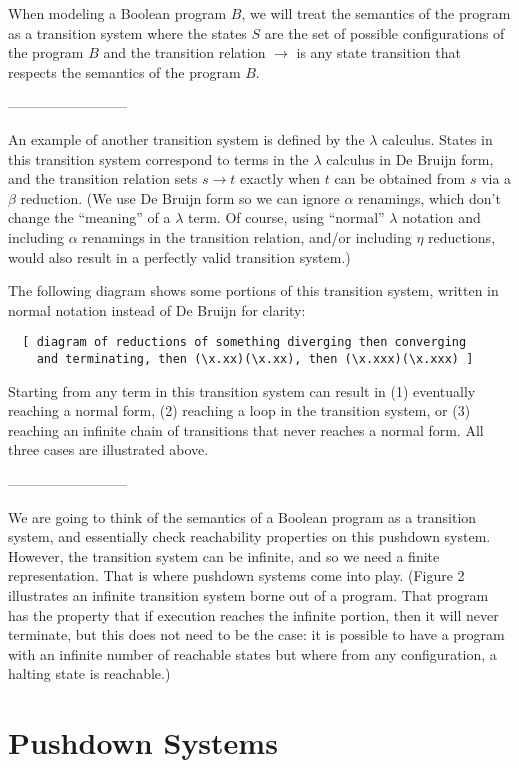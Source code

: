 \documentclass{article}
\begin{document}
When modeling a Boolean program $B$, we will treat the semantics of
the program as a transition system where the states $S$ are the set of
possible configurations of the program $B$ and the transition relation
$\rightarrow$ is any state transition that respects the semantics of
the program $B$.

--------------------------

An example of another transition system is defined by the
$\lambda$ calculus. States in this transition system correspond to
terms in the $\lambda$ calculus in De Bruijn form, and the transition
relation sets $s \rightarrow t$ exactly when $t$ can be obtained from
$s$ via a $\beta$ reduction. (We use De Bruijn form so we can ignore
$\alpha$ renamings, which don't change the ``meaning'' of a
$\lambda$ term. Of course, using ``normal'' $\lambda$ notation and
including $\alpha$ renamings in the transition relation, and/or
including $\eta$ reductions, would also result in a perfectly valid
transition system.)

The following diagram shows some portions of this transition system,
written in normal notation instead of De Bruijn for clarity:

\begin{verbatim}
  [ diagram of reductions of something diverging then converging
    and terminating, then (\x.xx)(\x.xx), then (\x.xxx)(\x.xxx) ]
\end{verbatim}

Starting from any term in this transition system can result in (1)
eventually reaching a normal form, (2) reaching a loop in the
transition system, or (3) reaching an infinite chain of transitions
that never reaches a normal form. All three cases are illustrated
above.

--------------------------

We are going to think of the semantics of a Boolean program as a
transition system, and essentially check reachability properties on
this pushdown system. However, the transition system can be infinite,
and so we need a finite representation. That is where pushdown systems
come into play. (Figure 2 illustrates an infinite transition system
borne out of a program. That program has the property that if
execution reaches the infinite portion, then it will never terminate,
but this does not need to be the case: it is possible to have a
program with an infinite number of reachable states but where from any
configuration, a halting state is reachable.)


\section{Pushdown Systems}
\end{document}

